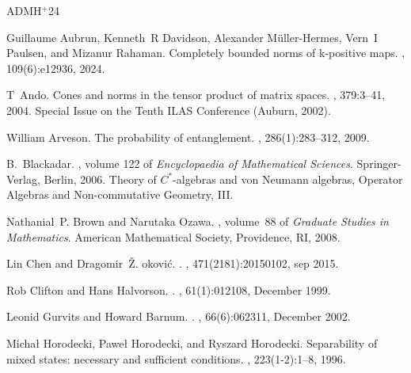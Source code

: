 \documentclass[11pt]{article}
\numberwithin{theorem}{section}
\begin{document}
\newcommand{\etalchar}[1]{$^{#1}$}
\begin{thebibliography}{ADMH{\etalchar{+}}24}

\bibitem[ADMH{\etalchar{+}}24]{aubrun}
Guillaume Aubrun, Kenneth~R Davidson, Alexander M{\"u}ller-Hermes, Vern~I
  Paulsen, and Mizanur Rahaman.
\newblock Completely bounded norms of k-positive maps.
, 109(6):e12936,
  2024.

T~Ando.
\newblock Cones and norms in the tensor product of matrix spaces.
, 379:3--41, 2004.
\newblock Special Issue on the Tenth ILAS Conference (Auburn, 2002).

William Arveson.
\newblock The probability of entanglement.
, 286(1):283--312, 2009.

B.~Blackadar.
, volume 122 of {\em Encyclopaedia of
  Mathematical Sciences}.
\newblock Springer-Verlag, Berlin, 2006.
\newblock Theory of $C^*$-algebras and von Neumann algebras, Operator Algebras
  and Non-commutative Geometry, III.

Nathanial~P. Brown and Narutaka Ozawa.
,
  volume~88 of {\em Graduate Studies in Mathematics}.
\newblock American Mathematical Society, Providence, RI, 2008.

Lin {Chen} and Dragomir~{\v{Z}}. {{\DH}okovi{\'c}}.
.
,
  471(2181):20150102, sep 2015.

Rob {Clifton} and Hans {Halvorson}.
.
, 61(1):012108, December 1999.

Leonid {Gurvits} and Howard {Barnum}.
.
, 66(6):062311, December 2002.

Micha\l{} Horodecki, Pawe\l{} Horodecki, and Ryszard Horodecki.
\newblock Separability of mixed states: necessary and sufficient conditions.
, 223(1-2):1--8, 1996.


\end{thebibliography}
\end{document}
